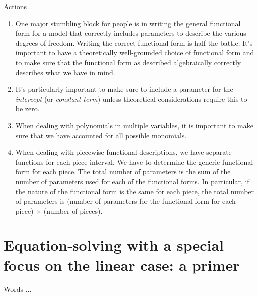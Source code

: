 \documentclass[10pt]{amsart}
\begin{document}
Actions ...

\begin{enumerate}
\item One major stumbling block for people is in writing the general
  functional form for a model that correctly includes parameters to
  describe the various degrees of freedom. Writing the correct
  functional form is half the battle. It's important to have a
  theoretically well-grounded choice of functional form and to make
  sure that the functional form as described algebraically correctly
  describes what we have in mind.
\item It's particularly important to make sure to include a parameter
  for the {\em intercept} (or {\em constant term}) unless theoretical
  considerations require this to be zero.
\item When dealing with polynomials in multiple variables, it is
  important to make sure that we have accounted for all possible monomials.
\item When dealing with piecewise functional descriptions, we have
  separate functions for each piece interval. We have to determine the
  generic functional form for each piece. The total number of
  parameters is the sum of the number of parameters used for each of
  the functional forms. In particular, if the nature of the functional
  form is the same for each piece, the total number of parameters is
  (number of parameters for the functional form for each piece)
  $\times$ (number of pieces).
\end{enumerate}

\section{Equation-solving with a special focus on the linear case: a primer}

Words ...
\end{document}
